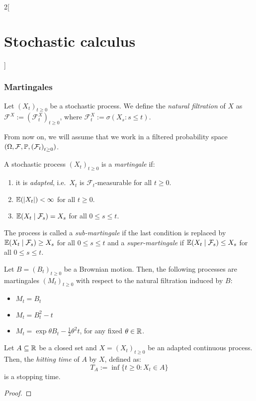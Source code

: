 \documentclass[../../../main_math.tex]{subfiles}
\begin{document}
\begin{multicols}{2}[\section{Stochastic calculus}]
  \subsubsection{Martingales}
  \begin{definition}
    Let ${(X_t)}_{t\geq 0}$ be a stochastic process. We define the \emph{natural filtration} of $X$ as $\mathcal{F}^X:={(\mathcal{F}_t^X)}_{t\geq 0}$, where $\mathcal{F}_t^X:=\sigma(X_s:s\leq t)$.
  \end{definition}
  From now on, we will assume that we work in a filtered probability space $(\Omega,\mathcal{F},\mathbb{P},{(\mathcal{F}_t)}_{t\geq 0})$.
  \begin{definition}[Martingale]
    A stochastic process ${(X_t)}_{t\geq 0}$ is a \emph{martingale} if:
    \begin{enumerate}
      \item it is \emph{adapted}, i.e.\ $X_t$ is $\mathcal{F}_t$-measurable for all $t\geq 0$.
      \item $\mathbb{E}(\abs{X_t})<\infty$ for all $t\geq 0$.
      \item $\mathbb{E}(X_t\mid \mathcal{F}_s)=X_s$ for all $0\leq s\leq t$.
    \end{enumerate}
    The process is called a \emph{sub-martingale} if the last condition is replaced by $\mathbb{E}(X_t\mid \mathcal{F}_s)\geq X_s$ for all $0\leq s\leq t$ and a \emph{super-martingale} if $\mathbb{E}(X_t\mid \mathcal{F}_s)\leq X_s$ for all $0\leq s\leq t$.
  \end{definition}
  \begin{proposition}
    Let $B={(B_t)}_{t\geq 0}$ be a Brownian motion. Then, the following processes are martingales ${(M_t)}_{t\geq 0}$ with respect to the natural filtration induced by $B$:
    \begin{itemize}
      \item $M_t=B_t$
      \item $M_t=B_t^2-t$
      \item $M_t=\exp{\theta B_t-\frac{1}{2}\theta^2t}$, for any fixed $\theta\in\mathbb{R}$.
    \end{itemize}
  \end{proposition}
  \begin{proposition}
    Let $A\subseteq \mathbb{R}$ be a closed set and $X={(X_t)}_{t\geq 0}$ be an adapted continuous process. Then, the \emph{hitting time} of $A$ by $X$, defined as:
    $$
      T_A:=\inf\{t\geq 0:X_t\in A\}
    $$
    is a stopping time.
  \end{proposition}
  \begin{proof}

\end{proof}
\end{multicols}
\end{document}
